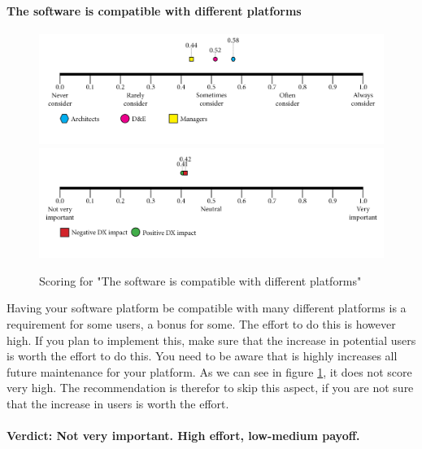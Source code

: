 \documentclass{article}
\begin{document}
\paragraph{The software is compatible with different platforms}
\begin{figure}[H]
\centering
\includegraphics[width=\linewidth]{scorelines/aspect12.png}
\includegraphics[width=\linewidth]{dxscorelines/dxaspect12.png}
\caption{Scoring for "The software is compatible with different platforms"}
\label{fig:aspect12}
\end{figure}
Having your software platform be compatible with many different platforms is a requirement for some users, a bonus for some. The effort to do this is however high. If you plan to implement this, make sure that the increase in potential users is worth the effort to do this. You need to be aware that is highly increases all future maintenance for your platform. As we can see in figure \ref{fig:aspect12}, it does not score very high. The recommendation is therefor to skip this aspect, if you are not sure that the increase in users is worth the effort. \\ \\
\textbf{Verdict: Not very important. High effort, low-medium payoff.}
\end{document}
